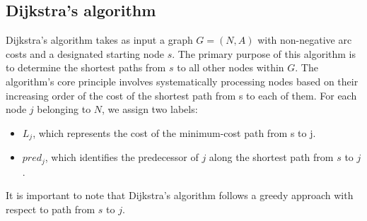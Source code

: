 \subsection{Dijkstra's algorithm}
Dijkstra's algorithm takes as input a graph $G = (N, A)$ with non-negative arc costs and a designated starting node $s$. 
The primary purpose of this algorithm is to determine the shortest paths from $s$ to all other nodes within $G$.
The algorithm's core principle involves systematically processing nodes based on their increasing order of the cost of the shortest path from s to each of them. 
For each node $j$ belonging to $N$, we assign two labels:
\begin{itemize}
    \item $L_j$, which represents the cost of the minimum-cost path from s to j.
    \item $pred_j$, which identifies the predecessor of $j$ along the shortest path from $s$ to $j$.
\end{itemize} 
It is important to note that Dijkstra's algorithm follows a greedy approach with respect to path from $s$ to $j$. 
